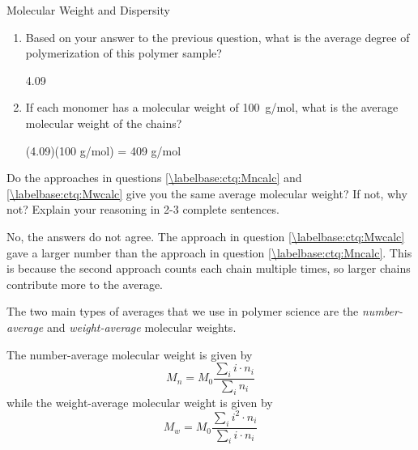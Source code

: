 \begin{activity}{Molecular Weight and Dispersity}
\begin{ctqs}
\begin{enumerate}
\begin{solution}[1.5in]{}
				\end{solution}
			
			\item Based on your answer to the previous question, what is the average degree of polymerization of this polymer sample?
			
				\begin{solution}[0.75in]{}
					4.09
				\end{solution}
				
			\item If each monomer has a molecular weight of 100~g/mol, what is the average molecular weight of the chains?
			
				\begin{solution}[1in]{}
					(4.09)(100 g/mol) = 409 g/mol
				\end{solution}
				
		\end{enumerate}
		
	\question Do the approaches in questions \ref{\labelbase:ctq:Mncalc} and \ref{\labelbase:ctq:Mwcalc} give you the same average molecular weight?  If not, why not?  Explain your reasoning in 2-3 complete sentences.
	
		\begin{solution}[3.25in]{}
			No, the answers do not agree.  The approach in question \ref{\labelbase:ctq:Mwcalc} gave a larger number than the approach in question \ref{\labelbase:ctq:Mncalc}.  
			This is because the second approach counts each chain multiple times, so larger chains contribute more to the average.
		\end{solution}
		
\end{ctqs}

\begin{infobox}
\label{\labelbase:infobox:MnMw}
	
	The two main types of averages that we use in polymer science are the \emph{number-average} and \emph{weight-average} molecular weights.
	
	The number-average molecular weight is given by
	\begin{equation*}
		M_n = M_0 \frac{\sum_i i \cdot n_i}{\sum_i n_i}
	\end{equation*}
	while the weight-average molecular weight is given by
	\begin{equation*}
		M_w = M_0 \frac{\sum_i i^2 \cdot n_i}{\sum_i i\cdot n_i}
	\end{equation*}
	

\end{infobox}
\end{activity}
